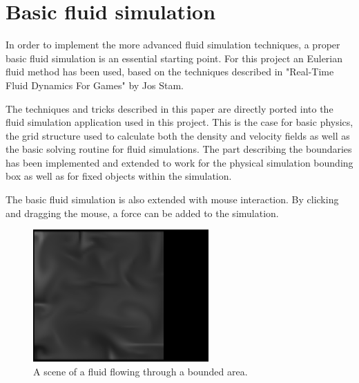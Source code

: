 \chapter{Basic fluid simulation}

In order to implement the more advanced fluid simulation techniques, a proper basic fluid simulation is an essential starting point. For this project an Eulerian fluid method has been used, based on the techniques described in "Real-Time Fluid Dynamics For Games" by Jos Stam.

The techniques and tricks described in this paper are directly ported into the fluid simulation application used in this project. This is the case for basic physics, the grid structure used to calculate both the density and velocity fields as well as the basic solving routine for fluid simulations. The part describing the boundaries has been implemented and extended to work for the physical simulation bounding box as well as for fixed objects within the simulation.

The basic fluid simulation is also extended with mouse interaction. By clicking and dragging the mouse, a force can be added to the simulation.

\begin{figure}[htb!]
    \centering
    \includegraphics[width=0.6\textwidth]{images/BasicFluid}
    \caption{A scene of a fluid flowing through a bounded area.}
    \label{fig:Basic_fluid}
\end{figure}